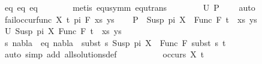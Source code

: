 \begin{isabellebody}
\ eq{}\ eq{}\ eq{}\isanewline
\ \ \ \ \ \ \isamarkupfalse%
\ {\isacharparenleft}{\kern0pt}metis\ equ{\isacharunderscore}{\kern0pt}symm\ equ{\isacharunderscore}{\kern0pt}trans{\isacharparenright}{\kern0pt}\isanewline
\ \ \isakeywordONE{{\isacharbraceright}{\kern0pt}}\isamarkupfalse%
\isanewline
\ \ \isamarkupfalse%
\ \isamarkupfalse%
\ {\isachardoublequoteopen}U\ {\isacharquery}{\kern0pt}P\ {\isacharequal}{\kern0pt}\ {\isacharbraceleft}{\kern0pt}{\isacharbraceright}{\kern0pt}{\isachardoublequoteclose}\ \isamarkupfalse%
\ auto\isanewline
{}\isamarkupfalse%
\isanewline
\ \ \isamarkupfalse%
\ {\isacharparenleft}{\kern0pt}fail{\isacharunderscore}{\kern0pt}occur{\isacharunderscore}{\kern0pt}func\ X\ t\ pi\ F\ xs\ ys{\isacharparenright}{\kern0pt}\isanewline
\ \ \isamarkupfalse%
\ {\isacharquery}{\kern0pt}P\ {\isacharequal}{\kern0pt}\ {\isachardoublequoteopen}{\isacharparenleft}{\kern0pt}Susp\ pi\ X\ {\isasymapprox}{\isacharquery}{\kern0pt}\ Func\ F\ t\ {\isacharhash}{\kern0pt}\ xs{\isacharcomma}{\kern0pt}\ ys{\isacharparenright}{\kern0pt}{\isachardoublequoteclose}\isanewline
\ \ \isakeywordONE{{\isacharbraceleft}{\kern0pt}}\isamarkupfalse%
\ \isamarkupfalse%
\ {\isachardoublequoteopen}U\ {\isacharparenleft}{\kern0pt}{\isacharparenleft}{\kern0pt}Susp\ pi\ X{\isacharcomma}{\kern0pt}\ Func\ F\ t{\isacharparenright}{\kern0pt}\ {\isacharhash}{\kern0pt}\ xs{\isacharcomma}{\kern0pt}\ ys{\isacharparenright}{\kern0pt}\ {\isasymnoteq}\ {\isacharbraceleft}{\kern0pt}{\isacharbraceright}{\kern0pt}{\isachardoublequoteclose}\isanewline
\ \ \ \ \isamarkupfalse%
\ \isamarkupfalse%
\ s\ nabla\ \ eq{}{\isacharcolon}{\kern0pt}\ {\isachardoublequoteopen}nabla\ {\isasymturnstile}\ subst\ s\ {\isacharparenleft}{\kern0pt}Susp\ pi\ X{\isacharparenright}{\kern0pt}\ {\isasymapprox}\ Func\ F\ {\isacharparenleft}{\kern0pt}subst\ s\ t{\isacharparenright}{\kern0pt}{\isachardoublequoteclose}\isanewline
\ \ \ \ \ \ \isamarkupfalse%
\ {\isacharparenleft}{\kern0pt}auto\ simp\ add{\isacharcolon}{\kern0pt}\ all{\isacharunderscore}{\kern0pt}solutions{\isacharunderscore}{\kern0pt}def{\isacharparenright}{\kern0pt}\isanewline
\ \ \ \ \isamarkupfalse%
\isanewline
\ \ \ \ \isamarkupfalse%
\ {\isachardoublequoteopen}occurs\ X\ t{\isachardoublequoteclose}\ \isamarkupfalse%

\end{isabellebody}
